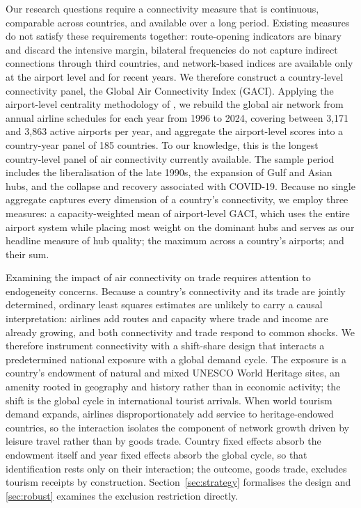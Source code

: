 Our research questions require a connectivity measure that is continuous, comparable across countries, and available over a long period. Existing measures do not satisfy these requirements together: route-opening
indicators are binary and discard the intensive margin, bilateral frequencies do not capture indirect connections through third countries, and network-based indices are available only at the airport level and for
recent years. We therefore construct a country-level connectivity panel, the Global Air Connectivity Index (GACI). Applying the airport-level centrality methodology of \citet{Cheung_2020}, we rebuild the global air
network from annual airline schedules for each year from 1996 to 2024, covering between 3{,}171 and 3{,}863 active airports per year, and aggregate the airport-level scores into a country-year panel of 185 countries. To our knowledge, this is the longest country-level panel of air connectivity currently available. The sample period includes the liberalisation of the late 1990s, the expansion of Gulf and Asian hubs,
and the collapse and recovery associated with COVID-19. Because no single aggregate captures every dimension of a country's connectivity, we employ three measures: a capacity-weighted mean of airport-level GACI, which uses the entire airport system while placing most weight on the dominant hubs and serves as our headline measure of hub quality; the maximum across a country's airports; and their sum.

Examining the impact of air connectivity on trade requires attention to endogeneity concerns. Because a country's connectivity and its trade are jointly determined, ordinary least squares estimates are unlikely to carry a causal interpretation: airlines add routes and capacity where trade and income are already growing, and both connectivity and trade respond to common shocks. We therefore instrument connectivity with a shift-share design that interacts a predetermined national exposure with a global demand cycle. The exposure is a country's endowment of natural and mixed UNESCO World Heritage sites, an amenity rooted in geography and history rather than in economic activity; the shift is the global cycle in international tourist arrivals. When world tourism demand expands, airlines disproportionately add service to heritage-endowed countries, so the interaction isolates the component of network growth driven by leisure travel rather than by goods trade. Country fixed effects absorb the endowment itself and year fixed effects absorb the global cycle, so that identification rests only on their interaction; the outcome, goods trade, excludes tourism receipts by construction. Section~\ref{sec:strategy} formalises the design and \ref{sec:robust} examines the exclusion restriction directly.

